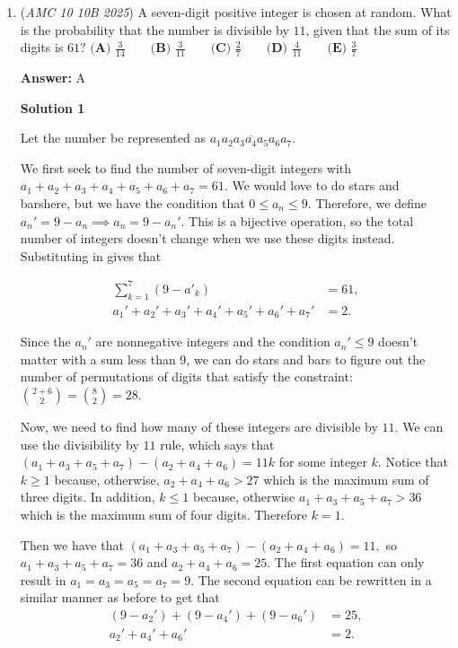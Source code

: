 \begin{enumerate}
 


	\item (\textit{AMC 10 10B 2025}) A seven-digit positive integer is chosen at random. What is the probability that the number is divisible by $11$, given that the sum of its digits is $61?$
$\textbf{(A) } \frac{3}{14} \qquad\textbf{(B) } \frac{3}{11} \qquad\textbf{(C) }\frac{2}{7}\qquad\textbf{(D) } \frac{4}{11} \qquad\textbf{(E) } \frac{3}{7}$

 \textbf{Answer: }A



\textbf{Solution 1}

Let the number be represented as $\overline{a_1a_2a_3a_4a_5a_6a_7}.$ 

 We first seek to find the number of seven-digit integers with $a_1+a_2+a_3+a_4+a_5+a_6+a_7 = 61.$ We would love to do stars and barshere, but we have the condition that $0 \leq a_n \leq 9.$ Therefore, we define $a_n' = 9-a_n \implies a_n = 9-a_n'.$ This is a bijective operation, so the total number of integers doesn't change when we use these digits instead. Substituting in gives that 

 \begin{align*}\sum_{k=1}^{7}{(9-a'_k)} &= 61, \\a_1' + a_2' + a_3' + a_4' + a_5' + a_6' + a_7' &= 2.\end{align*}


 Since the $a_n'$ are nonnegative integers and the condition $a_n' \leq 9$ doesn't matter with a sum less than 9, we can do stars and bars to figure out the number of permutations of digits that satisfy the constraint: ${{2+6}\choose {2}} = {8\choose 2} = 28.$

 Now, we need to find how many of these integers are divisible by $11.$ We can use the divisibility by $11$ rule, which says that $(a_1+a_3+a_5+a_7) - (a_2+a_4+a_6) = 11k$ for some integer $k.$ Notice that $k \geq 1$ because, otherwise, $a_2+a_4+a_6 > 27$ which is the maximum sum of three digits. In addition, $k \leq 1$ because, otherwise $a_1+a_3+a_5+a_7 > 36$ which is the maximum sum of four digits. Therefore $k = 1.$

 Then we have that $(a_1+a_3+a_5+a_7) - (a_2+a_4+a_6) = 11,$ so $a_1+a_3+a_5+a_7 = 36$ and $a_2+a_4+a_6 = 25.$ The first equation can only result in $a_1=a_3=a_5=a_7 = 9.$ The second equation can be rewritten in a similar manner as before to get that \begin{align*}(9-a_2') + (9-a_4') + (9-a_6') &= 25, \\a_2' + a_4' + a_6' &= 2.\end{align*}



\end{enumerate}
